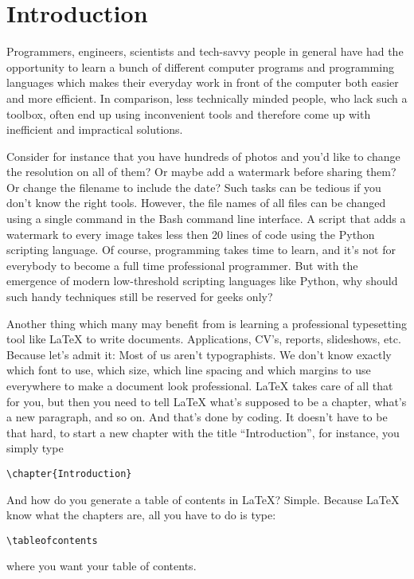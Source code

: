 \chapter{Introduction}
Programmers, engineers, scientists and tech-savvy people in general have had the opportunity to learn a bunch of different computer programs and programming languages which makes their everyday work in front of the computer both easier and more efficient. In comparison, less technically minded people, who lack such a toolbox, often end up using inconvenient tools and therefore come up with inefficient and impractical solutions.

Consider for instance that you have hundreds of photos and you’d like to change the resolution on all of them? Or maybe add a watermark before sharing them? Or change the filename to include the date? Such tasks can be tedious if you don’t know the right tools. However, the file names of all files can be changed using a single command in the Bash command line interface. A script that adds a watermark to every image takes less then 20 lines of code using the Python scripting language. Of course, programming takes time to learn, and it’s not for everybody to become a full time professional programmer. But with the emergence of modern low-threshold scripting languages like Python, why should such handy techniques still be reserved for geeks only?

Another thing which many may benefit from is learning a professional typesetting tool like LaTeX to write documents. Applications, CV’s, reports, slideshows, etc. Because let’s admit it: Most of us aren’t typographists. We don’t know exactly which font to use, which size, which line spacing and which margins to use everywhere to make a document look professional. LaTeX takes care of all that for you, but then you need to tell LaTeX what’s supposed to be a chapter, what’s a new paragraph, and so on. And that’s done by coding. It doesn’t have to be that hard, to start a new chapter with the title “Introduction”, for instance, you simply type 

\begin{verbatim}
\chapter{Introduction}
\end{verbatim}
And how do you generate a table of contents in LaTeX? Simple. Because LaTeX know what the chapters are, all you have to do is type:
\begin{verbatim}
\tableofcontents
\end{verbatim}
where you want your table of contents.

